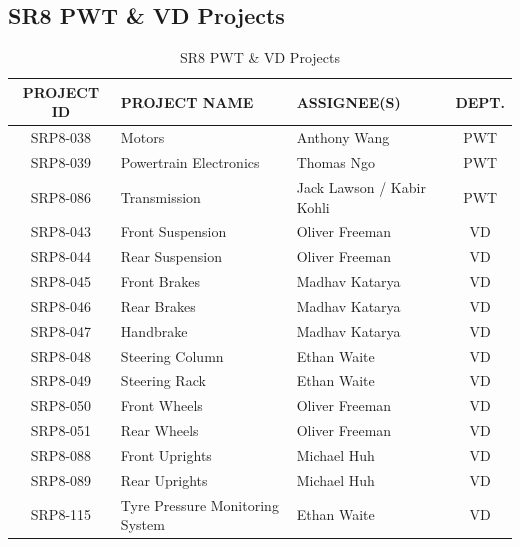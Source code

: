     \subsection{SR8 PWT \& VD Projects}
        \begin{table}[h]
            \centering
            \renewcommand{\arraystretch}{1.2}
            \begin{tabularx}{\textwidth}{|c|X|X|c|}
            \hline
            \textbf{PROJECT ID} & \textbf{PROJECT NAME} & \textbf{ASSIGNEE(S)} & \textbf{DEPT.} \\
            \hline
            SRP8-038 & Motors & Anthony Wang & PWT \\
            SRP8-039 & Powertrain Electronics & Thomas Ngo & PWT \\
            SRP8-086 & Transmission & Jack Lawson / Kabir Kohli & PWT \\
            SRP8-043 & Front Suspension & Oliver Freeman & VD \\
            SRP8-044 & Rear Suspension & Oliver Freeman & VD \\
            SRP8-045 & Front Brakes & Madhav Katarya & VD \\
            SRP8-046 & Rear Brakes & Madhav Katarya & VD \\
            SRP8-047 & Handbrake & Madhav Katarya & VD \\
            SRP8-048 & Steering Column & Ethan Waite & VD \\
            SRP8-049 & Steering Rack & Ethan Waite & VD \\
            SRP8-050 & Front Wheels & Oliver Freeman & VD \\
            SRP8-051 & Rear Wheels & Oliver Freeman & VD \\
            SRP8-088 & Front Uprights & Michael Huh & VD \\
            SRP8-089 & Rear Uprights & Michael Huh & VD \\
            SRP8-115 & Tyre Pressure Monitoring System & Ethan Waite & VD \\
            \hline
            \end{tabularx}
            \caption{SR8 PWT \& VD Projects}
            \label{tab:pwt-vd-projects}
        \end{table}

    \newpage

